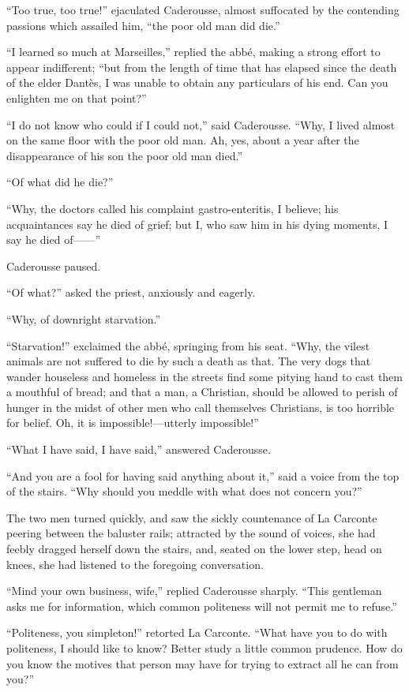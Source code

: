 “Too true, too true!” ejaculated Caderousse, almost suffocated by the
contending passions which assailed him, “the poor old man did die.”

“I learned so much at Marseilles,” replied the abbé, making a strong
effort to appear indifferent; “but from the length of time that has
elapsed since the death of the elder Dantès, I was unable to obtain any
particulars of his end. Can you enlighten me on that point?”

“I do not know who could if I could not,” said Caderousse. “Why, I
lived almost on the same floor with the poor old man. Ah, yes, about a
year after the disappearance of his son the poor old man died.”

“Of what did he die?”

“Why, the doctors called his complaint gastro-enteritis, I believe; his
acquaintances say he died of grief; but I, who saw him in his dying
moments, I say he died of——”

Caderousse paused.

“Of what?” asked the priest, anxiously and eagerly.

“Why, of downright starvation.”

“Starvation!” exclaimed the abbé, springing from his seat. “Why, the
vilest animals are not suffered to die by such a death as that. The
very dogs that wander houseless and homeless in the streets find some
pitying hand to cast them a mouthful of bread; and that a man, a
Christian, should be allowed to perish of hunger in the midst of other
men who call themselves Christians, is too horrible for belief. Oh, it
is impossible!—utterly impossible!”

“What I have said, I have said,” answered Caderousse.

“And you are a fool for having said anything about it,” said a voice
from the top of the stairs. “Why should you meddle with what does not
concern you?”

The two men turned quickly, and saw the sickly countenance of La
Carconte peering between the baluster rails; attracted by the sound of
voices, she had feebly dragged herself down the stairs, and, seated on
the lower step, head on knees, she had listened to the foregoing
conversation.

“Mind your own business, wife,” replied Caderousse sharply. “This
gentleman asks me for information, which common politeness will not
permit me to refuse.”

“Politeness, you simpleton!” retorted La Carconte. “What have you to do
with politeness, I should like to know? Better study a little common
prudence. How do you know the motives that person may have for trying
to extract all he can from you?”


